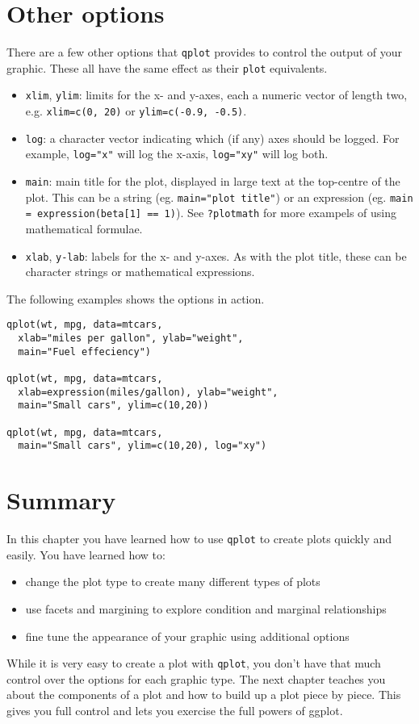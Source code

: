 \section{Other options}\label{sec:other_options}

There are a few other options that {\tt qplot} provides to control the output of your graphic.  These all have the same effect as their {\tt plot} equivalents.

\begin{itemize}
	\item {\tt xlim}, {\tt ylim}: limits for the x- and y-axes, each a numeric vector of length two, e.g. {\tt xlim=c(0, 20)} or {\tt ylim=c(-0.9, -0.5)}.
	\item {\tt log}: a character vector indicating which (if any) axes should be logged.  For example, {\tt log="x"} will log the x-axis, {\tt log="xy"} will log both.
	\item {\tt main}: main title for the plot, displayed in large text at the top-centre of the plot.  This can be a string (eg. {\tt main="plot title"}) or an expression (eg. {\tt main = expression(beta[1] == 1)}).  See {\tt ?plotmath} for more exampels of using mathematical formulae.
	\item {\tt xlab}, {\tt y-lab}: labels for the x- and y-axes.  As with the plot title, these can be character strings or mathematical expressions.
\end{itemize}

The following examples shows the options in action.

\begin{verbatim}
qplot(wt, mpg, data=mtcars, 
  xlab="miles per gallon", ylab="weight", 
  main="Fuel effeciency")

qplot(wt, mpg, data=mtcars, 
  xlab=expression(miles/gallon), ylab="weight", 
  main="Small cars", ylim=c(10,20))

qplot(wt, mpg, data=mtcars, 
  main="Small cars", ylim=c(10,20), log="xy")
\end{verbatim}


\section{Summary}

In this chapter you have learned how to use {\tt qplot} to create plots quickly and easily. You have learned how to:

\begin{itemize}
	\item change the plot type to create many different types of plots
	\item use facets and margining to explore condition and marginal relationships
	\item fine tune the appearance of your graphic using additional options
\end{itemize}

While it is very easy to create a plot with {\tt qplot}, you don't have that much control over the options for each graphic type.  The next chapter teaches you about the components of a plot and how to build up a plot piece by piece.  This gives you full control and lets you exercise the full powers of ggplot.  


